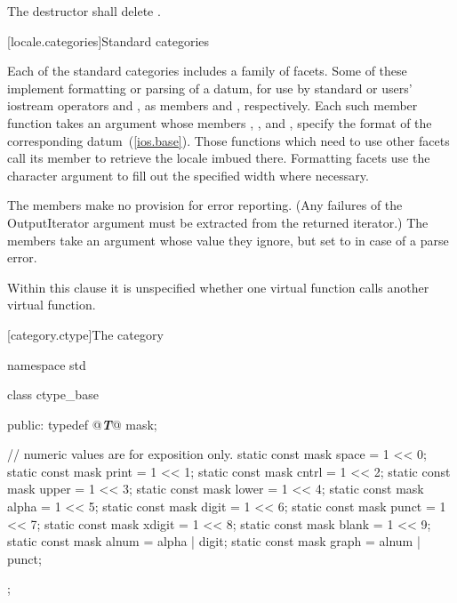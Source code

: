 \begin{itemdescr}
\pnum
\effects The destructor shall delete .
\end{itemdescr}

[locale.categories]{Standard  categories}

\pnum
Each of the standard categories includes a family of facets.
Some of these implement formatting or parsing of a datum, for use
by standard or users' iostream operators
\tcode{\shl}
and
\tcode{\shr},
as members
and
,
respectively.
Each such member function takes an
%
argument whose members
%
,
%
,
and
%
,
specify the format of the corresponding datum~(\ref{ios.base}).
Those functions which need to use other facets call its member
to retrieve the locale imbued there.
Formatting facets use the character argument
to fill out the specified width where necessary.

\pnum
The
members make no provision for error reporting.
(Any failures of the
OutputIterator argument must be extracted from the returned iterator.)
The
members take an
argument whose value they ignore, but set to
in case of a parse error.

\pnum
Within this clause it is unspecified whether one virtual function calls another
virtual function.

[category.ctype]{The  category}

%
\begin{codeblock}
namespace std {
  class ctype_base {
  public:
    typedef @\textbf{\textit{T}}@ mask;

    // numeric values are for exposition only.
    static const mask space = 1 << 0;
    static const mask print = 1 << 1;
    static const mask cntrl = 1 << 2;
    static const mask upper = 1 << 3;
    static const mask lower = 1 << 4;
    static const mask alpha = 1 << 5;
    static const mask digit = 1 << 6;
    static const mask punct = 1 << 7;
    static const mask xdigit = 1 << 8;
    static const mask blank = 1 << 9;
    static const mask alnum = alpha | digit;
    static const mask graph = alnum | punct;
  };
}
\end{codeblock}

